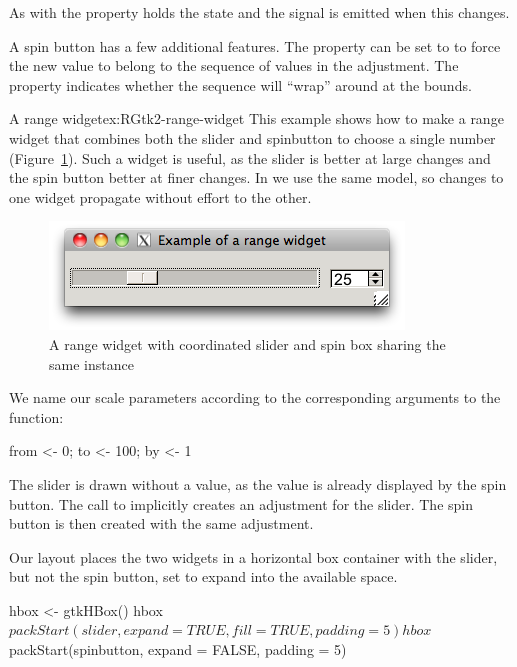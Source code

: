 As with  the  property holds the state and
the  signal is emitted when this changes.

A spin button has a few additional features. The property
 can be set to  to force the new value
to belong to the sequence of values in the adjustment. The 
property indicates whether the sequence will ``wrap'' around at the
bounds.

\begin{example}{A range widget}{ex:RGtk2-range-widget}
This example shows how to make a range widget that combines both the
slider and spinbutton to choose a single number
(Figure~\ref{fig:RGtk2-range-widget}). Such a widget is useful, as the
slider is better at large changes and the spin button better at finer
changes. In \GTK\/ we use the same  model, so
changes to one widget propagate without effort to the other.

\begin{figure}
  \centering
  \includegraphics[width=.5\textwidth]{fig-RGtk2-range-widget.png}
  \caption{A range widget with coordinated slider and spin box sharing the same  instance}
  \label{fig:RGtk2-range-widget}
\end{figure}


We name our scale parameters according to the corresponding arguments
to the  function:
\begin{Schunk}
\begin{Sinput}
 from <- 0; to <- 100; by <- 1
\end{Sinput}
\end{Schunk}

The slider is drawn without a value, as the value is already displayed
by the spin button. The call to  implicitly
creates an adjustment for the slider. The spin button is then created
with the same adjustment.
\begin{Schunk}
\end{Schunk}
%
Our layout places the two widgets in a horizontal box container with
the slider, but not the spin button, set to expand into the available
space.
\begin{Schunk}
\begin{Sinput}
 hbox <- gtkHBox()
 hbox$packStart(slider, expand = TRUE, fill = TRUE, padding = 5)
 hbox$packStart(spinbutton, expand = FALSE, padding = 5)
\end{Sinput}
\end{Schunk}


\end{example}


